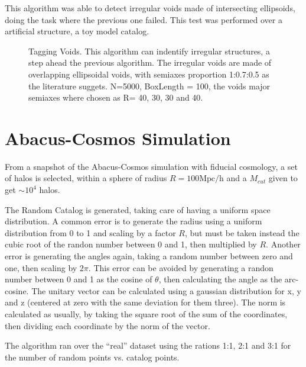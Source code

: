 \documentclass[preprint]{aastex62}
\begin{document}
This algorithm was able to detect irregular voids made of intersecting
ellipsoids, doing the task where the previous one failed. This test was performed
over a artificial structure, a toy model catalog.


\begin{figure}
  \caption{Tagging Voids. This algorithm can indentify irregular structures,
    a step ahead the previous algorithm. The irregular voids are made of
    overlapping ellipsoidal voids, with semiaxes proportion 1:0.7:0.5 as the 
    literature suggets.  %
    N=5000, BoxLength = 100, the voids major semiaxes where chosen as
    R= 40, 30, 30 and 40.
    \label{Tagging voids}}
\end{figure}


\section{Abacus-Cosmos Simulation}

From a snapshot of the Abacus-Cosmos simulation with fiducial cosmology, a set of
halos is selected, within a sphere of radius $R=100\mathrm{Mpc/h}$ and a $M_{cut}$
given to get $\sim 10^4$ halos.

The Random Catalog is generated, taking care of having a uniform space
distribution. A common error is to generate the radius using a uniform
distribution from 0 to 1 and scaling by a factor $R$,
but must be taken instead the cubic root of the randon number between 0 and 1,
then multiplied by $R$. Another error is generating the angles again, taking a
random number between zero and one, then scaling by $2\pi$. This error can be
avoided by generating a randon number between 0 and 1 as the cosine of $\theta$,
then calculating the angle as the arc-cosine. The unitary vector can be
calculated using a gaussian distribution for x, y and z (centered at zero
with the same deviation for them three).  %
The norm is calculated as usually, by taking the square root of the sum of
the coordinates, then dividing each coordinate by the norm of the vector.

The algorithm ran over the ``real'' dataset using the rations 1:1, 2:1
and 3:1 for the number of random points vs. catalog points.
\end{document}
